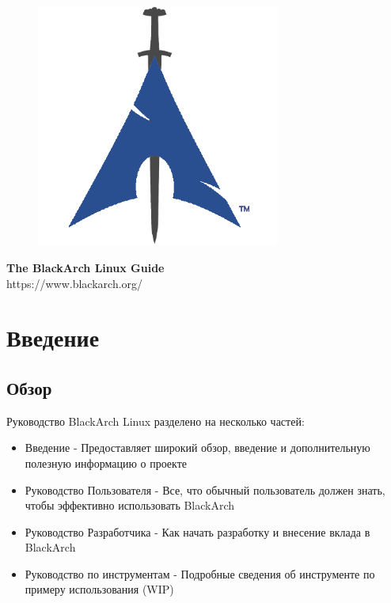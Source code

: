 \documentclass[a4paper, oneside, 11pt]{book}
\begin{document}
\pagestyle{empty}
\begin{center}
\begin{figure}[htbp]
\centering
\vspace{0.5cm}
\includegraphics[width=8cm]{images/logo.png}
\label{fig:logo}
\end{figure}
\vspace{0.5cm}
\Huge{\textbf{The BlackArch Linux Guide}}\\
\vspace{1cm}
\Large{\color{blue}https://www.blackarch.org/}\\
\vspace{0.5cm}
\end{center}
\newpage
\tableofcontents
\newpage
\pagestyle{fancy}


\chapter{Введение}

\section{Обзор}
Руководство BlackArch Linux разделено на несколько частей:
\begin{itemize}
\item Введение - Предоставляет широкий обзор, введение и дополнительную полезную информацию о проекте
\item Руководство Пользователя - Все, что обычный пользователь должен знать, чтобы эффективно использовать BlackArch
\item Руководство Разработчика - Как начать разработку и внесение вклада в BlackArch
\item Руководство по инструментам - Подробные сведения об инструменте по примеру использования (WIP)
\end{itemize}
\end{document}
